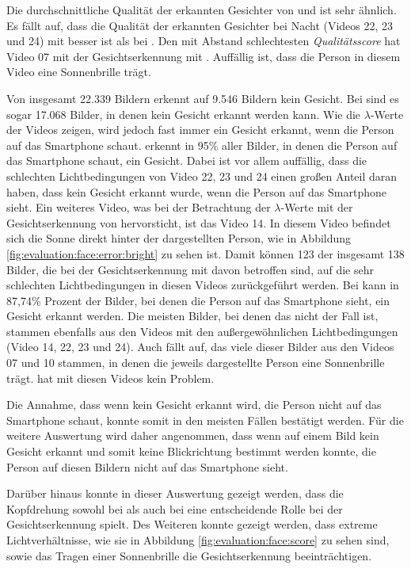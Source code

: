 Die durchschnittliche Qualität der erkannten Gesichter von \dlib und \mediapipe ist sehr ähnlich. Es fällt auf, dass die Qualität der erkannten Gesichter bei Nacht (Videos 22, 23 und 24) mit \mediapipe besser ist als bei \dlib. Den mit Abstand schlechtesten \textit{Qualitätsscore} hat Video 07 mit der Gesichtserkennung mit \dlib. Auffällig ist, dass die Person in diesem Video eine Sonnenbrille trägt.

Von insgesamt 22.339 Bildern erkennt \mediapipe auf 9.546 Bildern kein Gesicht. Bei \dlib sind es sogar 17.068 Bilder, in denen kein Gesicht erkannt werden kann. Wie die $\lambda$-Werte der Videos zeigen, wird jedoch fast immer ein Gesicht erkannt, wenn die Person auf das Smartphone schaut. \mediapipe erkennt in 95\% aller Bilder, in denen die Person auf das Smartphone schaut, ein Gesicht.  Dabei ist vor allem auffällig, dass die schlechten Lichtbedingungen von Video 22, 23 und 24 einen großen Anteil daran haben, dass kein Gesicht erkannt wurde, wenn die Person auf das Smartphone sieht. Ein weiteres Video, was bei der Betrachtung der $\lambda$-Werte mit der Gesichtserkennung von \mediapipe hervorsticht, ist das Video 14. In diesem Video befindet sich die Sonne direkt hinter der dargestellten Person, wie in Abbildung \ref{fig:evaluation:face:error:bright} zu sehen ist.  Damit können 123 der insgesamt 138 Bilder, die bei der Gesichtserkennung mit \mediapipe davon betroffen sind, auf die sehr schlechten Lichtbedingungen in diesen Videos zurückgeführt werden. Bei \dlib kann in 87,74\% Prozent der Bilder, bei denen die Person auf das Smartphone sieht, ein Gesicht erkannt werden. Die meisten Bilder, bei denen das nicht der Fall ist, stammen ebenfalls aus den Videos mit den außergewöhnlichen Lichtbedingungen (Video 14, 22, 23 und 24). Auch fällt auf, das viele dieser Bilder aus den Videos 07 und 10 stammen, in denen die jeweils dargestellte Person eine Sonnenbrille trägt. \mediapipe hat mit diesen Videos kein Problem. 

Die Annahme, dass wenn kein Gesicht erkannt wird, die Person nicht auf das Smartphone schaut, konnte somit in den meisten Fällen bestätigt werden. Für die weitere Auswertung wird daher angenommen, dass wenn auf einem Bild kein Gesicht erkannt und somit keine Blickrichtung bestimmt werden konnte, die Person auf diesen Bildern nicht auf das Smartphone sieht.

Darüber hinaus konnte in dieser Auswertung gezeigt werden, dass die Kopfdrehung sowohl bei \dlib als auch bei \mediapipe eine entscheidende Rolle bei der Gesichtserkennung spielt. Des Weiteren konnte gezeigt werden, dass extreme Lichtverhältnisse, wie sie in Abbildung \ref{fig:evaluation:face:score} zu sehen sind, sowie das Tragen einer Sonnenbrille die Gesichtserkennung beeinträchtigen. 

